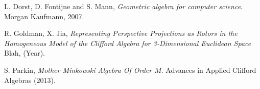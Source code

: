 \documentclass{birkjour}
\theoremstyle{definition}
\theoremstyle{remark}
\numberwithin{equation}{section}
\begin{document}
\begin{thebibliography}{9}

L. Dorst, D. Fontijne and S. Mann, {\it Geometric algebra for computer
science}. Morgan Kaufmann, 2007.

R. Goldman, X. Jia, {\it Representing Perspective Projections as Rotors
in the Homogeneous Model of the Clifford Algebra for 3-Dimensional Euclidean Space}
Blah, (Year).

S. Parkin, {\it Mother Minkowski Algebra Of Order $M$}.
Advances in Applied Clifford Algebras (2013).

\end{thebibliography}
\end{document}
